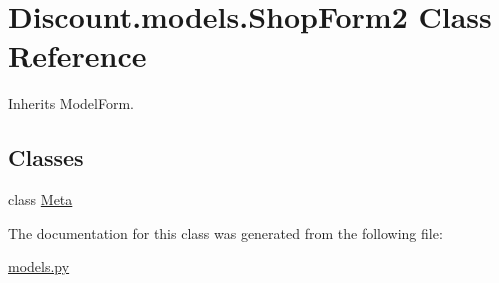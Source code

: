 \hypertarget{class_discount_1_1models_1_1_shop_form2}{}\section{Discount.\+models.\+Shop\+Form2 Class Reference}
\label{class_discount_1_1models_1_1_shop_form2}


Inherits Model\+Form.

\subsection*{Classes}
\begin{DoxyCompactItemize}
\item 
class \hyperlink{class_discount_1_1models_1_1_shop_form2_1_1_meta}{Meta}
\end{DoxyCompactItemize}


The documentation for this class was generated from the following file\+:\begin{DoxyCompactItemize}
\item 
\hyperlink{models_8py}{models.\+py}\end{DoxyCompactItemize}
